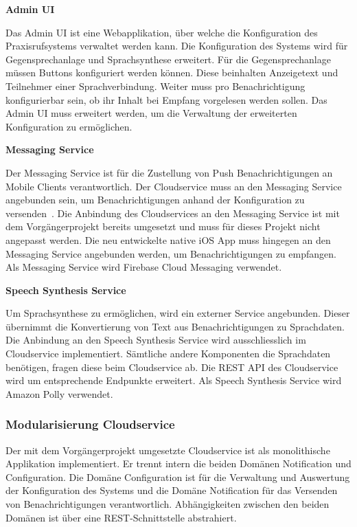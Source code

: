 \textbf{Admin UI}

Das Admin UI ist eine Webapplikation, über welche die Konfiguration des Praxisrufsystems verwaltet werden kann.
Die Konfiguration des Systems wird für Gegensprechanlage und Sprachsynthese erweitert.
Für die Gegensprechanlage müssen Buttons konfiguriert werden können.
Diese beinhalten Anzeigetext und Teilnehmer einer Sprachverbindung.
Weiter muss pro Benachrichtigung konfigurierbar sein, ob ihr Inhalt bei Empfang vorgelesen werden sollen.
Das Admin UI muss erweitert werden, um die Verwaltung der erweiterten Konfiguration zu ermöglichen.

\textbf{Messaging Service}

Der Messaging Service ist für die Zustellung von Push Benachrichtigungen an Mobile Clients verantwortlich.
Der Cloudservice muss an den Messaging Service angebunden sein, um Benachrichtigungen anhand der Konfiguration zu versenden~\cite{ip5}.
Die Anbindung des Cloudservices an den Messaging Service ist mit dem Vorgängerprojekt bereits umgesetzt und muss für dieses Projekt nicht angepasst werden.
Die neu entwickelte native iOS App muss hingegen an den Messaging Service angebunden werden, um Benachrichtigungen zu empfangen.
Als Messaging Service wird Firebase Cloud Messaging verwendet.

\textbf{Speech Synthesis Service}

Um Sprachsynthese zu ermöglichen, wird ein externer Service angebunden.
Dieser übernimmt die Konvertierung von Text aus Benachrichtigungen zu Sprachdaten.
Die Anbindung an den Speech Synthesis Service wird ausschliesslich im Cloudservice implementiert.
Sämtliche andere Komponenten die Sprachdaten benötigen, fragen diese beim Cloudservice ab.
Die REST API des Cloudservice wird um entsprechende Endpunkte erweitert.
Als Speech Synthesis Service wird Amazon Polly verwendet.

\subsubsection{Modularisierung Cloudservice}

Der mit dem Vorgängerprojekt umgesetzte Cloudservice ist als monolithische Applikation implementiert.
Er trennt intern die beiden Domänen Notification und Configuration.
Die Domäne Configuration ist für die Verwaltung und Auswertung der Konfiguration des Systems und die Domäne Notification für das Versenden von Benachrichtigungen verantwortlich.
Abhängigkeiten zwischen den beiden Domänen ist über eine REST-Schnittstelle abstrahiert.


